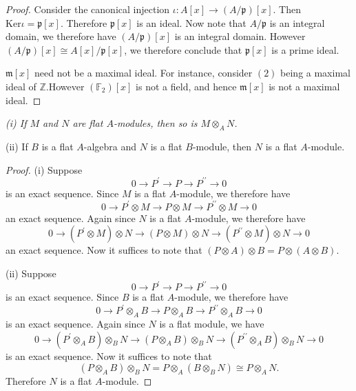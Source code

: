 \begin{proof}
Consider the canonical injection $\iota:A[x]\to(A/\mathfrak{p})[x]$. Then $\mathrm{Ker}\iota=\mathfrak{p}[x]$. Therefore $\mathfrak{p}[x]$ is an ideal. Now note that $A/\mathfrak{p}$ is an integral domain, we therefore have $(A/\mathfrak{p})[x]$ is an integral domain. However $(A/\mathfrak{p})[x]\cong A[x]/\mathfrak{p}[x]$, we therefore conclude that $\mathfrak{p}[x]$ is a prime ideal.\par
$\mathfrak{m}[x]$ need not be a maximal ideal. For instance, consider $(2)$ being a maximal ideal of $\mathbb{Z}$.However $(\mathbb{F}_2)[x]$ is not a field, and hence $\mathfrak{m}[x]$ is not a maximal ideal.
\end{proof}
\begin{problem}\em
(i) If $M$ and $N$ are flat $A$-modules, then so is $M\otimes_AN$.\par
(ii) If $B$ is a flat $A$-algebra and $N$ is a flat $B$-module, then $N$ is a flat $A$-module.
\end{problem}
\begin{proof}
(i) Suppose 
$$
0\longrightarrow P^{\prime}\longrightarrow P\longrightarrow P^{\prime\prime}\longrightarrow 0
$$
is an exact sequence. Since $M$ is a flat $A$-module, we therefore have 
$$
0\longrightarrow P^{\prime}\otimes M\longrightarrow P\otimes M\longrightarrow P^{\prime\prime}\otimes M\longrightarrow 0
$$
an exact sequence. Again since $N$ is a flat $A$-module, we therefore have 
$$
0\longrightarrow \left( P^{\prime}\otimes M \right) \otimes N\longrightarrow \left( P\otimes M \right) \otimes N\longrightarrow \left( P^{\prime\prime}\otimes M \right) \otimes N\longrightarrow 0
$$
an exact sequence. Now it suffices to note that $(P\otimes A)\otimes B=P\otimes(A\otimes B)$.\par
(ii) Suppose 
$$
0\longrightarrow P^{\prime}\longrightarrow P\longrightarrow P^{\prime\prime}\longrightarrow 0
$$
is an exact sequence. Since $B$ is a flat $A$-module, we therefore have 
$$
0\longrightarrow P^{\prime}\otimes _AB\longrightarrow P\otimes _AB\longrightarrow P^{\prime\prime}\otimes _AB\longrightarrow 0
$$
is an exact sequence. Again since $N$ is a flat module, we have 
$$
0\longrightarrow \left( P^{\prime}\otimes _AB \right) \otimes _BN\longrightarrow \left( P\otimes _AB \right) \otimes _BN\longrightarrow \left( P^{\prime\prime}\otimes _AB \right) \otimes _BN\longrightarrow 0
$$
is an exact sequence. Now it suffices to note that 
$$
\left( P\otimes _AB \right) \otimes _BN=P\otimes _A\left( B\otimes _BN \right) \cong P\otimes _AN.
$$
Therefore $N$ is a flat $A$-module.
\end{proof}
